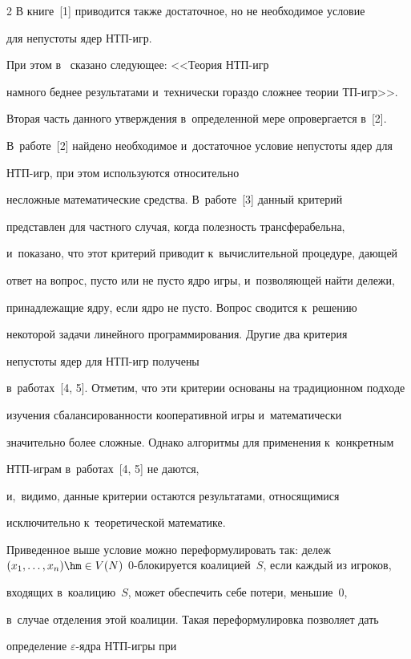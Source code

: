 \begin{multicols}{2}
     В книге~[1] приводится также достаточное, но не необходимое условие 

для непустоты ядер НТП-игр. 

При этом в~\cite[с.~148]{1-sh} сказано следующее: <<Тео\-рия НТП-игр 

намного беднее результатами и~технически гораздо сложнее теории ТП-игр>>. 

Вторая часть данного утверждения в~определенной мере опровергается в~[2]. 

В~работе~[2] найдено необходимое и~достаточное условие непустоты ядер для 

НТП-игр, при этом используются относительно 

несложные математические средства. В~работе~[3] данный критерий 

пред\-став\-лен для частного случая, когда полезность трансферабельна, 

и~показано, что этот критерий приводит к~вычислительной процедуре, дающей 

ответ на вопрос, пусто или не пусто ядро игры, и~позволяющей найти дележи, 

принадлежащие ядру, если ядро не пусто. Вопрос сводится к~решению 

некоторой задачи линейного программирования. Другие два критерия 

непустоты ядер для НТП-игр получены 

в~работах~[4, 5]. Отметим, что эти критерии основаны на традиционном подходе 

изучения сбалансированности кооперативной игры и~математически 

значительно более сложные. Однако алгоритмы для применения к~конкретным 

НТП-иг\-рам в~работах~[4, 5] не даются, 

и,~видимо, данные критерии остаются результатами, относящимися 

исключительно к~теоретической математике.



Приведенное выше условие можно переформулировать так: дележ $(x_1, \ldots , 

x_n)\hm \in V(N)$ 0-бло\-ки\-ру\-ет\-ся коалицией~$S$, если каждый из игроков, 

входящих в~коалицию~$S$, может обеспечить себе потери, меньшие~0, 

в~случае отделения этой коалиции. Такая переформулировка позволяет дать 

определение $\varepsilon$-яд\-ра НТП-иг\-ры при 


\end{multicols}
